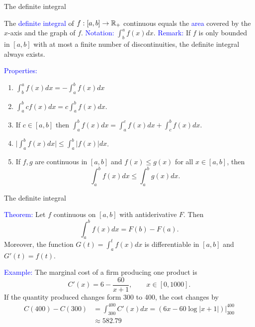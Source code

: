 \documentclass[11pt,aspectratio=169]{beamer}
\begin{document}
\begin{frame}{The definite integral}

The \textcolor{blue}{definite integral} of $f:[a,b] \rightarrow \mathbb R_+$ continuous equals the 
\textcolor{blue}{area} covered by the $x$-axis and the graph of $f$.
\vskip 12pt
 \textcolor{blue}{Notation:} $\int_b^a f(x) dx.$ \textcolor{blue}{Remark:} If $f$ is only bounded in $[a,b]$ with at most a finite number of discontinuities, the definite integral always exists.
 




 \textcolor{blue}{Properties:} 
\begin{enumerate}
\item $\int_b^a f(x) dx=- \int_a^b f(x) dx $

\item  $\int_a^b cf(x) dx=c \int_a^b f(x) dx$.

\item If $c \in [a,b]$ then $\int_a^b f(x) dx= \int_a^c f(x) dx +\int_c^b f(x) dx$.
\item $\big\vert \int_a^b f(x) dx\big\vert \leq \int_a^b \vert f(x) \vert dx$.
\item If $f,g$ are continuous in $[a,b]$ and $f(x) \leq g(x)$ for all $x \in [a,b]$, then
$$
\int_a^b f(x) dx\leq \int_a^b g(x) dx.
$$
\end{enumerate}\end{frame}\begin{frame}{The definite integral}

\textcolor{blue}{Theorem:} Let $f$ continuous on $[a,b]$ with antiderivative $F$. Then 
$$
\int_a^b f(x) dx=F(b)-F(a).
$$
Moreover, the function $G(t)=\int_a^t f(x) dx$ is differentiable in $[a,b]$ and
$G'(t)=f(t)$. 
\vskip 12pt

\textcolor{blue}{Example:} The marginal cost of a firm producing one product is
$$
C'(x)=6-\frac{60}{x+1}, \qquad x \in [0,1000].
$$
If the quantity produced changes form 300 to 400, the cost changes by
\begin{equation*}
\begin{split}
C(400)-C(300)&=\int_{300}^{400} C'(x) dx=(6x-60\log \vert x+1 \vert) \bigg\vert_{300}^{400} \\
&\approx 582.79
\end{split}
\end{equation*}
\end{frame}
\end{document}
